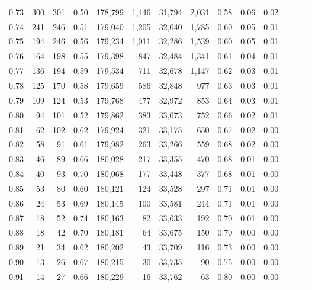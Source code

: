 \begin{tabular}{rrrrrrrrrrrrrr}
0.73 &    300 &    301 &  0.50 &  178,799 &    1,446 &  31,794 &   2,031 &  0.58 &  0.06 &      0.02 \\
0.74 &    241 &    246 &  0.51 &  179,040 &    1,205 &  32,040 &   1,785 &  0.60 &  0.05 &      0.01 \\
0.75 &    194 &    246 &  0.56 &  179,234 &    1,011 &  32,286 &   1,539 &  0.60 &  0.05 &      0.01 \\
0.76 &    164 &    198 &  0.55 &  179,398 &      847 &  32,484 &   1,341 &  0.61 &  0.04 &      0.01 \\
0.77 &    136 &    194 &  0.59 &  179,534 &      711 &  32,678 &   1,147 &  0.62 &  0.03 &      0.01 \\
0.78 &    125 &    170 &  0.58 &  179,659 &      586 &  32,848 &     977 &  0.63 &  0.03 &      0.01 \\
0.79 &    109 &    124 &  0.53 &  179,768 &      477 &  32,972 &     853 &  0.64 &  0.03 &      0.01 \\
0.80 &     94 &    101 &  0.52 &  179,862 &      383 &  33,073 &     752 &  0.66 &  0.02 &      0.01 \\
0.81 &     62 &    102 &  0.62 &  179,924 &      321 &  33,175 &     650 &  0.67 &  0.02 &      0.00 \\
0.82 &     58 &     91 &  0.61 &  179,982 &      263 &  33,266 &     559 &  0.68 &  0.02 &      0.00 \\
0.83 &     46 &     89 &  0.66 &  180,028 &      217 &  33,355 &     470 &  0.68 &  0.01 &      0.00 \\
0.84 &     40 &     93 &  0.70 &  180,068 &      177 &  33,448 &     377 &  0.68 &  0.01 &      0.00 \\
0.85 &     53 &     80 &  0.60 &  180,121 &      124 &  33,528 &     297 &  0.71 &  0.01 &      0.00 \\
0.86 &     24 &     53 &  0.69 &  180,145 &      100 &  33,581 &     244 &  0.71 &  0.01 &      0.00 \\
0.87 &     18 &     52 &  0.74 &  180,163 &       82 &  33,633 &     192 &  0.70 &  0.01 &      0.00 \\
0.88 &     18 &     42 &  0.70 &  180,181 &       64 &  33,675 &     150 &  0.70 &  0.00 &      0.00 \\
0.89 &     21 &     34 &  0.62 &  180,202 &       43 &  33,709 &     116 &  0.73 &  0.00 &      0.00 \\
0.90 &     13 &     26 &  0.67 &  180,215 &       30 &  33,735 &      90 &  0.75 &  0.00 &      0.00 \\
0.91 &     14 &     27 &  0.66 &  180,229 &       16 &  33,762 &      63 &  0.80 &  0.00 &      0.00 \\

\end{tabular}
